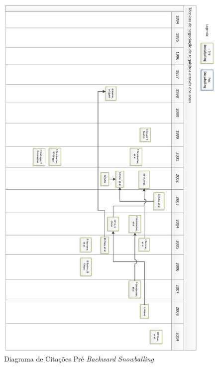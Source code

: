 \begin{figure}[ht]
 \centering
 \includegraphics[scale=0.47]{pre_sb.eps}
 \caption{\label{fig:presb}Diagrama de Citações Pré \textit{Backward
 Snowballing}}
\end{figure}

\FloatBarrier

